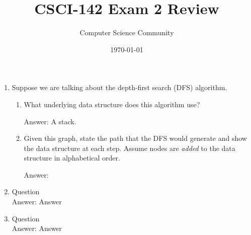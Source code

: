 \documentclass[11pt]{article}
\title{CSCI-142 Exam 2 Review}
\author{Computer Science Community}
\date{\today}
\newenvironment{answer}{\large\lstset{basicstyle=\large\ttfamily}\color{white} \small{Answer:}}{}
\newenvironment{answer}{\large\lstset{basicstyle=\large\ttfamily}\color{red} \small{Answer:}}{}
\begin{document}
\header
\begin{enumerate}


\item Suppose we are talking about the depth-first search (DFS) algorithm.
\begin{enumerate}
\item What underlying data structure does this algorithm use?

\begin{answer}
A stack.
\end{answer}

\item %
Given this graph, state the path that the DFS would generate and show the data structure at each step.
Assume nodes are \emph{added} to the data structure in alphabetical order.

\begin{answer}

\end{answer}
\end{enumerate}

\item Question \\
\begin{answer}
Answer
\end{answer}


\item Question \\
\begin{answer}
Answer
\end{answer}


\end{enumerate}
\end{document}
